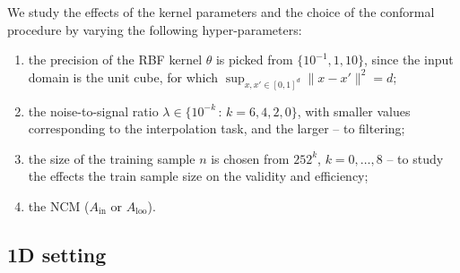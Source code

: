\documentclass[a4paper,14pt]{extarticle}
\begin{document}
We study the effects of the kernel parameters and the choice of the conformal procedure
by varying the following hyper-parameters: \begin{enumerate}
  \item the precision of the RBF kernel $\theta$ is picked from $\{10^{-1}, 1, 10\}$,
  since the input domain is the unit cube, for which $\sup_{x,x'\in[0,1]^d}\|x-x'\|^2 = d$;
  \item the noise-to-signal ratio $\lambda \in\{10^{-k}\,:\,k=6, 4, 2, 0\}$, with
  smaller values corresponding to the interpolation task, and the larger -- to filtering;
  \item the size of the training sample $n$ is chosen from $25 2^k$, $k=0,\ldots, 8$ --
  to study the effects the train sample size on the validity and efficiency;
  \item the NCM ($A_{\text{in}}$ or $A_{\text{loo}}$).
\end{enumerate}


\subsection{1D setting} %
\label{sub:1d_setting}
\end{document}
